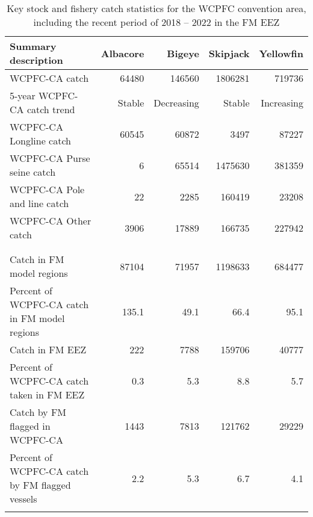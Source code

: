 \begin{longtable}{lrrrr}
\caption{Key stock and fishery catch statistics for the WCPFC convention area, including the recent period of 2018 -- 2022 in the FM EEZ} \\ 
  \hline
Summary description & Albacore & Bigeye & Skipjack & Yellowfin \\ 
  \hline
WCPFC-CA catch & 64480 & 146560 & 1806281 & 719736 \\ 
  5-year WCPFC-CA catch trend & Stable & Decreasing & Stable & Increasing \\ 
  WCPFC-CA Longline catch & 60545 & 60872 & 3497 & 87227 \\ 
  WCPFC-CA Purse seine catch & 6 & 65514 & 1475630 & 381359 \\ 
  WCPFC-CA Pole and line catch & 22 & 2285 & 160419 & 23208 \\ 
  WCPFC-CA Other catch & 3906 & 17889 & 166735 & 227942 \\ 
   &  &  &  &  \\ 
   \hline
 &  &  &  &  \\ 
  Catch in FM model regions & 87104 & 71957 & 1198633 & 684477 \\ 
  Percent of WCPFC-CA catch in FM model regions & 135.1 & 49.1 & 66.4 & 95.1 \\ 
  Catch in FM EEZ & 222 & 7788 & 159706 & 40777 \\ 
  Percent of WCPFC-CA catch taken in FM EEZ & 0.3 & 5.3 & 8.8 & 5.7 \\ 
  Catch by FM flagged in WCPFC-CA & 1443 & 7813 & 121762 & 29229 \\ 
  Percent of WCPFC-CA catch by FM flagged vessels & 2.2 & 5.3 & 6.7 & 4.1 \\ 
  \hline
\label{cat_sum_tab}
\end{longtable}
